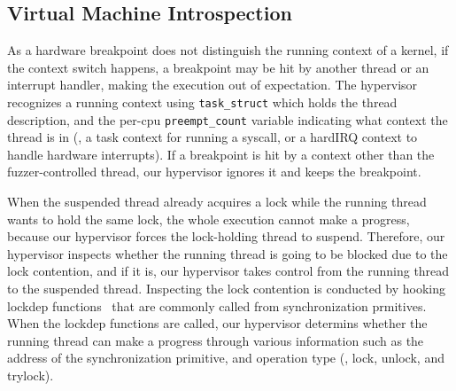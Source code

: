 \subsection{Virtual Machine Introspection}
\label{s:appendix:vmi}


As a hardware breakpoint does not distinguish the running context of a
kernel, if the context switch happens, a breakpoint may be hit by
another thread or an interrupt handler, making the execution out of
expectation.
%
The hypervisor recognizes a running context using \texttt{task_struct}
which holds the thread description, and the per-cpu
\texttt{preempt_count} variable indicating what context the thread is
in (\eg, a task context for running a syscall, or a hardIRQ context to
handle hardware interrupts).
%
If a breakpoint is hit by a context other than the fuzzer-controlled
thread, our hypervisor ignores it and keeps the breakpoint.



When the suspended thread already acquires a lock while the running
thread wants to hold the same lock, the whole execution cannot make a
progress, because our hypervisor forces the lock-holding thread to
suspend.
%
Therefore, our hypervisor inspects whether the running thread is going
to be blocked due to the lock contention, and if it is, our hypervisor
takes control from the running thread to the suspended thread.
%
Inspecting the lock contention is conducted by hooking lockdep
functions~\cite{lockdep} that are commonly called from synchronization
prmitives.
%
When the lockdep functions are called, our hypervisor determins
whether the running thread can make a progress through various
information such as the address of the synchronization primitive, and
operation type (\ie, lock, unlock, and trylock).


